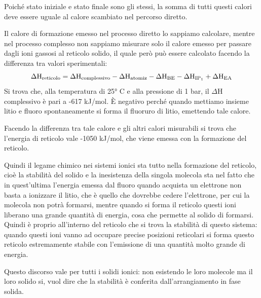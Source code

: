 \vspace{-0.2cm}Poiché stato iniziale e stato finale sono gli stessi, la somma di tutti questi calori deve essere uguale al calore scambiato nel percorso diretto.

Il calore di formazione emesso nel processo diretto lo sappiamo calcolare, mentre nel processo complesso non sappiamo misurare solo il calore emesso per passare dagli ioni gassosi al reticolo solido, il quale però può essere calcolato facendo la differenza tra valori sperimentali:
$$\Delta\rm{H}_{reticolo}=\Delta\rm{H}_{complessivo} - \Delta\rm{H}_{atomiz} - \Delta\rm{H}_{BE} - \Delta\rm{H}_{IP_1} + \Delta\rm{H}_{EA}$$
Si trova che, alla temperatura di 25° C e alla pressione di 1 bar, il $\Delta$H complessivo è pari a -617 kJ/mol. È negativo perché quando mettiamo insieme litio e fluoro spontaneamente si forma il fluoruro di litio, emettendo tale calore.

Facendo la differenza tra tale calore e gli altri calori misurabili si trova che l'energia di reticolo vale -1050 kJ/mol, che viene emessa con la formazione del reticolo.

Quindi il legame chimico nei sistemi ionici sta tutto nella formazione del reticolo, cioè la stabilità del solido e la inesistenza della singola molecola sta nel fatto che in quest'ultima l'energia emessa dal fluoro quando acquista un elettrone non basta a ionizzare il litio, che è quello che dovrebbe cedere l'elettrone, per cui la molecola non potrà formarsi, mentre quando si forma il reticolo questi ioni liberano una grande quantità di energia, cosa che permette al solido di formarsi. Quindi è proprio all'interno del reticolo che si trova la stabilità di questo sistema: quando questi ioni vanno ad occupare precise posizioni reticolari si forma questo reticolo estremamente stabile con l'emissione di una quantità molto grande di energia.

Questo discorso vale per tutti i solidi ionici: non esistendo le loro molecole ma il loro solido si, vuol dire che la stabilità è conferita dall'arrangiamento in fase solida.


